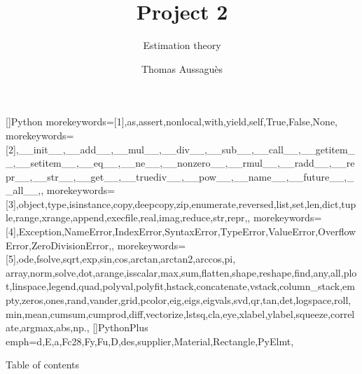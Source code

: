 \documentclass[UKenglish,8pt,aspectratio=1610]{beamer}
\author{Thomas Aussaguès}
\title{Project 2}
\subtitle{Estimation theory}
\begin{document}
[]{Python}{
	morekeywords=[1]{,as,assert,nonlocal,with,yield,self,True,False,None,} %
	morekeywords=[2]{,__init__,__add__,__mul__,__div__,__sub__,__call__,__getitem__,__setitem__,__eq__,__ne__,__nonzero__,__rmul__,__radd__,__repr__,__str__,__get__,__truediv__,__pow__,__name__,__future__,__all__,}, %
	morekeywords=[3]{,object,type,isinstance,copy,deepcopy,zip,enumerate,reversed,list,set,len,dict,tuple,range,xrange,append,execfile,real,imag,reduce,str,repr,}, %
	morekeywords=[4]{,Exception,NameError,IndexError,SyntaxError,TypeError,ValueError,OverflowError,ZeroDivisionError,}, %
	morekeywords=[5]{,ode,fsolve,sqrt,exp,sin,cos,arctan,arctan2,arccos,pi, array,norm,solve,dot,arange,isscalar,max,sum,flatten,shape,reshape,find,any,all,plot,linspace,legend,quad,polyval,polyfit,hstack,concatenate,vstack,column_stack,empty,zeros,ones,rand,vander,grid,pcolor,eig,eigs,eigvals,svd,qr,tan,det,logspace,roll,min,mean,cumsum,cumprod,diff,vectorize,lstsq,cla,eye,xlabel,ylabel,squeeze,correlate,argmax,abs,np.}, %
}
[]{PythonPlus}{
	emph={d,E,a,Fc28,Fy,Fu,D,des,supplier,Material,Rectangle,PyElmt},
}


\begin{frame}{Table of contents}
    \tableofcontents
\end{frame}
\end{document}
